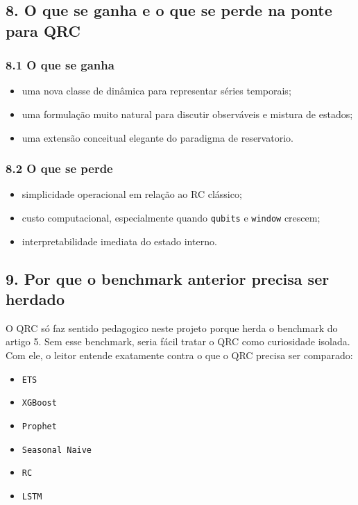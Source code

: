 \documentclass[12pt]{article}
\providecommand{\tightlist}{%
          \setlength{\itemsep}{0pt}\setlength{\parskip}{0pt}}
\begin{document}
\subsection{8. O que se ganha e o que se perde na ponte para QRC}\label{8-o-que-se-ganha-e-o-que-se-perde-na-ponte-para-qrc}

\subsubsection{8.1 O que se ganha}\label{81-o-que-se-ganha}

\begin{itemize}
\tightlist
\item
  uma nova classe de dinâmica para representar séries temporais;
\item
  uma formulação muito natural para discutir observáveis e mistura de estados;
\item
  uma extensão conceitual elegante do paradigma de reservatorio.
\end{itemize}

\subsubsection{8.2 O que se perde}\label{82-o-que-se-perde}

\begin{itemize}
\tightlist
\item
  simplicidade operacional em relação ao RC clássico;
\item
  custo computacional, especialmente quando \texttt{qubits} e \texttt{window} crescem;
\item
  interpretabilidade imediata do estado interno.
\end{itemize}

\subsection{9. Por que o benchmark anterior precisa ser herdado}\label{9-por-que-o-benchmark-anterior-precisa-ser-herdado}

O QRC só faz sentido pedagogico neste projeto porque herda o benchmark do artigo 5. Sem esse benchmark, seria fácil tratar o QRC como curiosidade isolada. Com ele, o leitor entende exatamente contra o que o QRC precisa ser comparado:

\begin{itemize}
\tightlist
\item
  \texttt{ETS}
\item
  \texttt{XGBoost}
\item
  \texttt{Prophet}
\item
  \texttt{Seasonal\ Naive}
\item
  \texttt{RC}
\item
  \texttt{LSTM}
\end{itemize}
\end{document}
